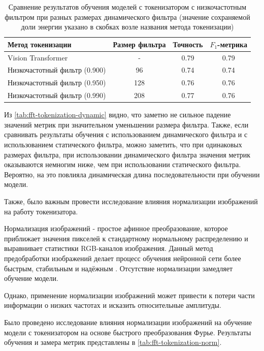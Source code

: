 \begin{table}[H]
  \centering
  \begin{tabular}{|l|c|c|c|}
    \hline
    Метод токенизации & Размер фильтра & Точность & $F_1$-метрика \\ \hline
    Vision Transformer & - & 0.79 & 0.79 \\
    Низкочастотный фильтр (0.900) & 96 & 0.74 & 0.74 \\
    Низкочастотный фильтр (0.950) & 128 & 0.76 & 0.76 \\
    Низкочастотный фильтр (0.990) & 208 & 0.77 & 0.76 \\
    \hline
  \end{tabular}

    \caption{Сравнение результатов обучения моделей с токенизатором с низкочастотным фильтром при разных размерах динамического фильтра (значение сохраняемой доли энергии указано в скобках возле названия метода токенизации)}
  \label{tab:fft-tokenization-dynamic}
\end{table}

Из \autoref{tab:fft-tokenization-dynamic} видно, что заметно не сильное падение значений метрик при значительном уменьшении размера фильтра. Также, если сравнивать результаты обучения с использованием динамического фильтра и с использованием статического фильтра, можно заметить, что при одинаковых размерах фильтра, при использовании динамического фильтра значения метрик оказываются немногим ниже, чем при использовании статического фильтра. Вероятно, на это повлияла динамическая длина последовательности при обучении модели.

Также, было важным провести исследование влияния нормализации изображений на работу токенизатора.

Нормализация изображений - простое афинное преобразование, которое приближает значения пикселей к стандартному нормальному распределению и выравнивает статистики RGB-каналов изображения. Данный метод предобработки изображений делает процесс обучения нейронной сети более быстрым, стабильным и надёжным \cite{goodfellow_dl}. Отсутствие нормализации замедляет обучение модели.

Однако, применение нормализации изображений может привести к потери части информации о низких частотах и исказить относительные амплитуды.

Было проведено исследование влияния нормализации изображений на обучение модели с токенизатором на основе быстрого преобразования Фурье. Результаты обучения и замера метрик представлены в \autoref{tab:fft-tokenization-norm}.

